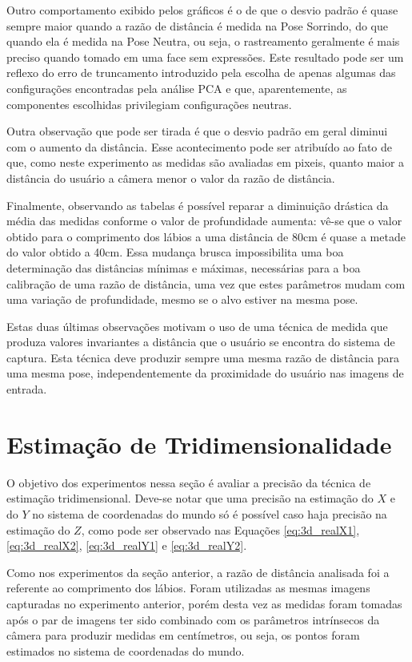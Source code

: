 Outro comportamento exibido pelos gráficos é o de que o desvio padrão é quase
sempre maior quando a razão de distância é medida na Pose Sorrindo, do que
quando ela é medida na Pose Neutra, ou seja, o rastreamento geralmente é mais
preciso quando tomado em uma face sem expressões.  Este resultado pode ser um
reflexo do erro de truncamento introduzido pela escolha de apenas algumas das
configurações encontradas pela análise PCA e que, aparentemente, as componentes
escolhidas privilegiam configurações neutras.

Outra observação que pode ser tirada é que o desvio padrão em geral diminui com
o aumento da distância. Esse acontecimento pode ser atribuído ao fato de que,
como neste experimento as medidas são avaliadas em pixeis, quanto maior a
distância do usuário a câmera menor o valor da razão de distância.

Finalmente, observando as tabelas é possível reparar a diminuição drástica da
média das medidas conforme o valor de profundidade aumenta: vê-se que o valor
obtido para o comprimento dos lábios a uma distância de 80cm é quase a metade do
valor obtido a 40cm.  Essa mudança brusca impossibilita uma boa determinação das
distâncias mínimas e máximas, necessárias para a boa calibração de uma razão de
distância, uma vez que estes parâmetros mudam com uma variação de profundidade,
mesmo se o alvo estiver na mesma pose.

Estas duas últimas observações motivam o uso de uma técnica de medida que
produza valores invariantes a distância que o usuário se encontra do sistema de
captura. Esta técnica deve produzir sempre uma mesma razão de distância para uma
mesma pose, independentemente da proximidade do usuário nas imagens de entrada.

\section{Estimação de Tridimensionalidade	}

O objetivo dos experimentos nessa seção é avaliar a precisão da técnica de
estimação tridimensional. Deve-se notar que uma precisão na estimação do $X$ e
do $Y$ no sistema de coordenadas do mundo só é possível caso haja precisão na
estimação do $Z$, como pode ser observado nas Equações \ref{eq:3d_realX1},
\ref{eq:3d_realX2}, \ref{eq:3d_realY1} e \ref{eq:3d_realY2}.

Como nos experimentos da seção anterior, a razão de distância analisada foi a
referente ao comprimento dos lábios. Foram utilizadas as mesmas imagens
capturadas no experimento anterior, porém desta vez as medidas foram tomadas
após o par de imagens ter sido combinado com os parâmetros intrínsecos da câmera
para produzir medidas em centímetros, ou seja, os pontos foram estimados no
sistema de coordenadas do mundo.


